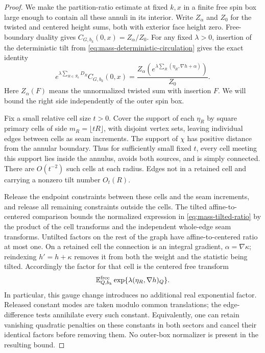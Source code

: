 \begin{proof}
We make the partition-ratio estimate at fixed \(k,x\) in a finite
free spin box large enough to contain all these annuli in its
interior.  Write \(Z_\alpha\) and \(Z_0\) for the twisted and
centered height sums, both with exterior face height zero.
Free-boundary duality gives \(C_{G,b_k}(0,x)=Z_\alpha/Z_0\).
For any fixed \(\lambda>0\), insertion of the deterministic tilt
from \eqref{eq:mass-deterministic-circulation} gives the exact identity
\begin{equation}\label{eq:mass-tilted-ratio}
 e^{\lambda\sum_{R\in\mathcal R_k}D_R}C_{G,b_k}(0,x)
 =\frac{Z_\alpha\left(
       e^{\lambda\sum_R(\eta_R,\nabla h+\alpha)}\right)}{Z_0}.
\end{equation}
Here \(Z_\alpha(F)\) means the unnormalized twisted sum with
insertion \(F\).  We will bound the right side independently of
the outer spin box.

Fix a small relative cell size \(t>0\).  Cover the support of each
\(\eta_R\) by square primary cells of side
\(m_R=\lfloor tR\rfloor\), with disjoint vertex sets, leaving
individual edges between cells as seam increments.  The support
of \(\chi\) has positive distance from the annular boundary.
Thus for sufficiently small fixed \(t\), every cell meeting this
support lies inside the annulus, avoids both sources, and is
simply connected.  There are \(O(t^{-2})\) such cells at each
radius.  Edges not in a retained cell and carrying a nonzero tilt
number \(O_t(R)\).

Release the endpoint constraints between these cells and the seam
increments, and release all remaining constraints outside the
cells.  The tilted affine-to-centered comparison
\cite[Lemma~2.2(ii)]{X} bounds the normalized expression in
\eqref{eq:mass-tilted-ratio} by the product of the cell transforms
and the independent whole-edge seam transforms.  Untilted factors
on the rest of the graph have affine-to-centered ratio at most
one.  On a retained cell the connection is an integral gradient,
\(\alpha=\nabla\kappa\); reindexing \(h'=h+\kappa\) removes it
from both the weight and the statistic being tilted.  Accordingly
the factor for that cell is the centered free transform
\[
             \mathbb E_{Q,b_k}^{\rm free}
                     \exp\{\lambda(\eta_R,\nabla h)_Q\}.
\]
In particular, this gauge change introduces no additional real
exponential factor.  Released constant modes are taken modulo
common translations; the edge-difference tests annihilate every
such constant.  Equivalently, one can retain vanishing quadratic
penalties on these constants in both sectors and cancel their
identical factors before removing them.  No outer-box normalizer
is present in the resulting bound.


\end{proof}
